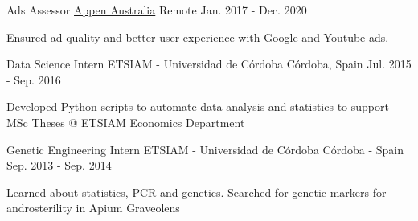 

\begin{cventries}

  \cventry
    {Ads Assessor}
    {\href{https://appen.com/}{Appen Australia}}
    {Remote}
    {Jan. 2017 - Dec. 2020}
     {
      \begin{cvitems}
        \item {Ensured ad quality and better user experience with Google and Youtube ads.}
      \end{cvitems}
    }

  \cventry
    {Data Science Intern}
    {ETSIAM - Universidad de Córdoba}
    {Córdoba, Spain}
    {Jul. 2015 - Sep. 2016}
     {
      \begin{cvitems}
        \item {Developed Python scripts to automate data analysis and statistics to support MSc Theses @ ETSIAM Economics Department}
      \end{cvitems}
    }

  \cventry
    {Genetic Engineering Intern}
    {ETSIAM - Universidad de Córdoba}
    {Córdoba - Spain}
    {Sep. 2013 - Sep. 2014}
     {
      \begin{cvitems}
        \item {Learned about statistics, PCR and genetics. Searched for genetic markers for androsterility in Apium Graveolens}
      \end{cvitems}
    }

\end{cventries}
